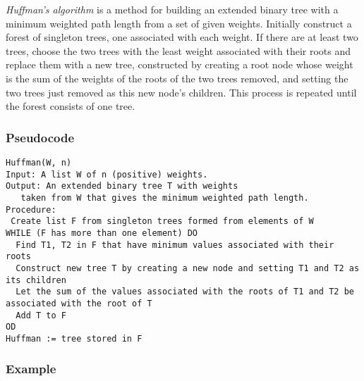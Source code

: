 \documentclass[12pt]{article}
\begin{document}

\emph{Huffman's algorithm} is a method for building an extended binary tree with a minimum weighted path length from a set of given weights.  Initially construct a forest of singleton trees, one associated with each weight.  If there are at least two trees, choose the two trees with the least weight associated with their roots and replace them with a new tree, constructed by creating a root node whose weight is the sum of the weights of the roots of the two trees removed, and setting the two trees just removed as this new node's children.  This process is repeated until the forest consists of one tree.

\subsubsection*{Pseudocode}


\begin{verbatim}
Huffman(W, n)
Input: A list W of n (positive) weights.
Output: An extended binary tree T with weights
   taken from W that gives the minimum weighted path length.
Procedure:
 Create list F from singleton trees formed from elements of W
WHILE (F has more than one element) DO
  Find T1, T2 in F that have minimum values associated with their roots
  Construct new tree T by creating a new node and setting T1 and T2 as its children
  Let the sum of the values associated with the roots of T1 and T2 be associated with the root of T
  Add T to F
OD
Huffman := tree stored in F
\end{verbatim}


\subsubsection*{Example}
\end{document}
